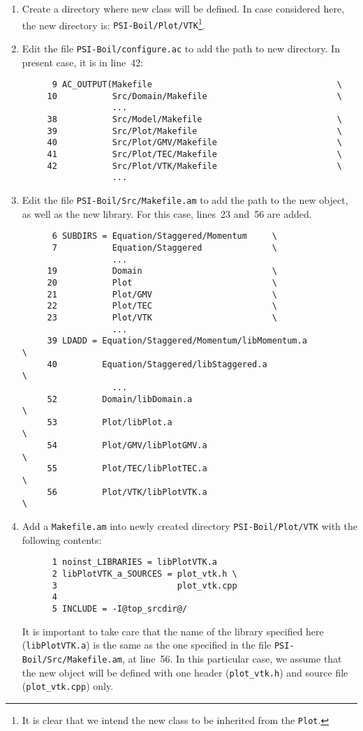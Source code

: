 \begin{enumerate}
  \item Create a directory where new class will be defined. In case considered
        here, the new directory is: {\tt PSI-Boil/Plot/VTK}\footnote{It is clear 
        that we intend the new class to be inherited from the {\tt Plot}.}. 
  \item Edit the file {\tt PSI-Boil/configure.ac} to add the path to new directory.
        In present case, it is in line~42:
%
{\small \begin{verbatim}
      9 AC_OUTPUT(Makefile                                     \
     10           Src/Domain/Makefile                          \
                  ... 
     38           Src/Model/Makefile                           \
     39           Src/Plot/Makefile                            \
     40           Src/Plot/GMV/Makefile                        \
     41           Src/Plot/TEC/Makefile                        \
     42           Src/Plot/VTK/Makefile                        \
                  ...
\end{verbatim}}
%
  \item Edit the file {\tt PSI-Boil/Src/Makefile.am} to add the path to the new
        object, as well as the new library. For this case, lines~23 and~56 are
        added. 
%
{\small \begin{verbatim}
      6 SUBDIRS = Equation/Staggered/Momentum     \
      7           Equation/Staggered              \
                  ...                               
     19           Domain                          \
     20           Plot                            \
     21           Plot/GMV                        \
     22           Plot/TEC                        \
     23           Plot/VTK                        \
                  ...                               
     39 LDADD = Equation/Staggered/Momentum/libMomentum.a          \
     40         Equation/Staggered/libStaggered.a                  \
                  ...                               
     52         Domain/libDomain.a                                 \
     53         Plot/libPlot.a                                     \
     54         Plot/GMV/libPlotGMV.a                              \
     55         Plot/TEC/libPlotTEC.a                              \
     56         Plot/VTK/libPlotVTK.a                              \
\end{verbatim}}
%
  \item Add a {\tt Makefile.am} into newly created directory {\tt PSI-Boil/Plot/VTK}
        with the following contents:
%
{\small \begin{verbatim}
      1 noinst_LIBRARIES = libPlotVTK.a
      2 libPlotVTK_a_SOURCES = plot_vtk.h \
      3                        plot_vtk.cpp
      4 
      5 INCLUDE = -I@top_srcdir@/
\end{verbatim}}
%
        It is important to take care that the name of the library specified here 
        ({\tt libPlotVTK.a}) is the same as the one specified in the file 
        {\tt PSI-Boil/Src/Makefile.am}, at line~56. In this particular case, we
        assume that the new object will be defined with one header ({\tt plot\_vtk.h}) 
        and source file ({\tt plot\_vtk.cpp}) only.


\end{enumerate}
